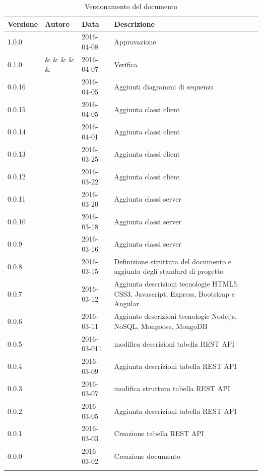 \documentclass[12pt,a4paper]{article}
\begin{document}
\begin{center}
	\begin{longtable}[H]{p{} p{} p{} p{}}
		\toprule
		\textbf{Versione}	&	\textbf{Autore}	&	\textbf{Data}	&	\textbf{Descrizione}\\*
		\midrule
		\midrule
		1.0.0 & \TP & 2016-04-08 & Approvazione \\*
		\midrule
		0.1.0 & \IB{} \& \AB{} \& \AVI{} \& \AVE \& \WS \& \NDC & 2016-04-07 & Verifica \\*
		\midrule
		0.0.16 & \NDC{} & 2016-04-05 & Aggiunti diagrammi di sequenza \\*
		\midrule
		0.0.15 & \IB{} & 2016-04-05 & Aggiunta classi client \\*
		\midrule
		0.0.14 & \WS{} & 2016-04-01 & Aggiunta classi client \\*
		\midrule
		0.0.13 & \AB{} & 2016-03-25 & Aggiunta classi client \\*
		\midrule
		0.0.12 & \NDC{} & 2016-03-22 & Aggiunta classi client \\*
		\midrule
		0.0.11 & \AVE{} & 2016-03-20 & Aggiunta classi server \\*
		\midrule
		0.0.10 & \AVI{} & 2016-03-18 & Aggiunta classi server \\*
		\midrule
		0.0.9 & \TP{} & 2016-03-16 & Aggiunta classi server \\*
        \midrule
        0.0.8 & \NDC{} & 2016-03-15 & Definizione struttura del documento e aggiunta
            degli standard di progetto \\*
		\midrule
		0.0.7 & \AVE{} & 2016-03-12 & Aggiunta descrizioni tecnologie HTML5, CSS3, Javascript, 
            Express, Bootstrap e Angular \\*
		\midrule
		0.0.6 & \AVE{} & 2016-03-11 & Aggiunte descrizioni tecnologie Node.js, NoSQL, Mongoose, MongoDB \\*
		\midrule
		0.0.5 & \AVE{} & 2016-03-011 &  modifica descrizioni tabella REST API \\*
		\midrule
		0.0.4 & \TP{} & 2016-03-09 &  Aggiunta descrizioni tabella REST API \\*
		\midrule
		0.0.3 & \TP{} & 2016-03-07 &  modifica struttura tabella REST API \\*
		\midrule
		0.0.2 & \AVI{} & 2016-03-05 &  Aggiunta descrizioni tabella REST API \\*
		\midrule
		0.0.1 & \NDC{} & 2016-03-03 &  Creazione tabella REST API \\*
		\midrule
		0.0.0 & \NDC{} & 2016-03-02 &  Creazione documento \\*
		\bottomrule
		\caption{Versionamento del documento}
		\label{tabVers1} 
	\end{longtable}
\end{center}
\end{document}

